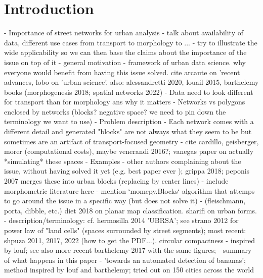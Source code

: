 \section{Introduction}
\label{sec:intro}

- Importance of street networks for urban analysis
    - talk about availability of data, different use cases from transport to morphology
    to ...
    - try to illustrate the wide applicability so we can then base the claims about the
    importance of the issue on top of it
    - general motivation - framework of urban data science. why everyone would
    benefit from having this issue solved. cite arcaute on 'recent advances, lobo on 'urban
    science'. also: alessandretti 2020, louail 2015, barthelemy books (morphogenesis 2018;
    spatial networks 2022)
- Data need to look different for transport than for morphology ans why it matters
    - Networks vs polygons enclosed by networks (blocks? negative space? we need to pin down the
    terminology we want to use)
- Problem description
    - Each network comes with a different detail and generated "blocks" are not always
    what they seem to be but sometimes are an artifact of transport-focused geometry
    - cite cardillo, geisberger, morer (computational costs), maybe venerandi 2016?;
    vanegas paper on actually *simulating* these spaces
- Examples - other authors complaining about the issue, without having solved
it yet (e.g. best paper ever \cite{vybornova2022automated}); grippa 2018; peponis 2007
merges these into urban blocks (replacing by center lines)
    - include morphometric literature here - mention `momepy.Blocks` algorithm that
    attemps to go around the issue in a specific way (but does not solve it)
        - (fleischmann, porta, dibble, etc.) diet 2018 on planar map
        classification. sharifi on urban forms.
    - description/terminology: cf. hermosilla 2014 'UBRSA'; see strano 2012 for power
    law of "land cells" (spaces surrounded by street segments); most recent: shpuza 2011,
    2017, 2022 (how to get the PDF...). circular compactness - inspired by louf; see also
    more recent barthelemy 2017 with the same figures;
-  summary of what happens in this paper
    - 'towards an automated detection of
    bananas'; method inspired by louf and barthelemy; tried out on 150 cities across the
    world

